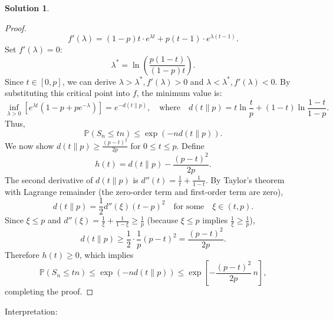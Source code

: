 \documentclass[12pt]{article}
\theoremstyle{definition}
\newtheorem*{solution}{\normalfont\textbf{Solution}}
\newcommand{\prob}{\mathbb{P}}
\begin{document}
\begin{enumerate}[leftmargin=*]
\begin{solution}
\begin{proof}
                \[
                f'(\lambda) = (1 - p)t \cdot e^{\lambda t} + p(t - 1) \cdot e^{\lambda(t - 1)}.
                \]
                Set \(f'(\lambda) = 0\):
                \[
                \lambda^* = \ln\left( \frac{p(1 - t)}{(1 - p)t} \right).
                \]
                Since \(t \in [0,p]\), we can derive \(\lambda > \lambda^*, f'(\lambda)>0\) and \(\lambda<\lambda^*, f'(\lambda)<0\).
                By substituting this critical point into \(f\), the minimum value is:
                \[
                \inf_{\lambda > 0} \left[ e^{\lambda t} (1 - p + pe^{-\lambda}) \right] = e^{-d(t \| p)}, \quad \text{where} \quad d(t \| p) = t \ln \frac{t}{p} + (1 - t) \ln \frac{1 - t}{1 - p}.
                \]
                Thus,
                \[
                \prob(S_n \leq tn) \leq \exp\left(-n  d(t \| p)\right).
                \]
                We now show \(d(t \| p) \geq \frac{(p - t)^2}{2p}\) for \(0 \leq t \leq p\). Define
                \[
                h(t) = d(t \| p) - \frac{(p - t)^2}{2p}.
                \]
                The second derivative of \(d(t \| p)\) is \(d''(t) = \frac{1}{t} + \frac{1}{1-t}\). By Taylor's theorem with Lagrange remainder (the zero-order term and first-order term are zero),
                \[
                d(t \| p) = \frac{1}{2} d''(\xi) (t - p)^2 \quad \text{for some} \quad \xi \in (t,p).
                \]
                Since \(\xi \leq p\) and \(d''(\xi) = \frac{1}{\xi} + \frac{1}{1-\xi} \geq \frac{1}{p}\) (because \(\xi \leq p\) implies \(\frac{1}{\xi} \geq \frac{1}{p}\)),
                \[
                d(t \| p) \geq \frac{1}{2} \cdot \frac{1}{p} (p - t)^2 = \frac{(p - t)^2}{2p}.
                \]
                Therefore \(h(t)\geq 0\), which implies
                \[
                \prob(S_n \leq tn) \leq \exp\left(-n  d(t \| p)\right) \leq \exp\left[ -\frac{(p - t)^2}{2p}\,n \right],
                \]
                completing the proof.
            \end{proof}
            Interpretation:


\end{solution}
\end{enumerate}
\end{document}
